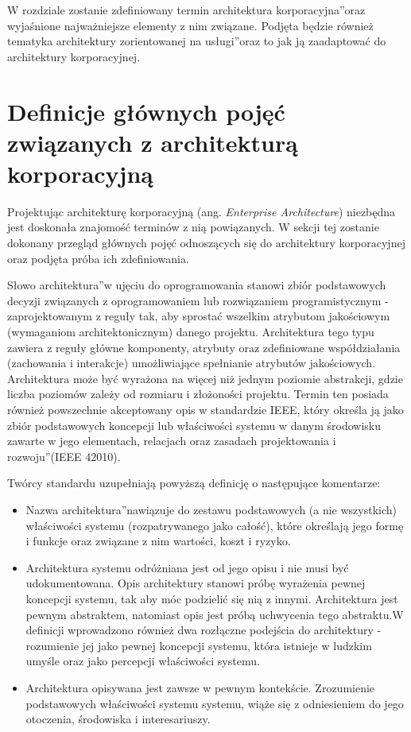 W rozdziale zostanie zdefiniowany termin \quotedblbase architektura korporacyjna\textquotedblright oraz wyjaśnione najważniejsze elementy z nim związane. Podjęta będzie również tematyka \quotedblbase architektury zorientowanej na usługi\textquotedblright oraz to jak ją zaadaptować do architektury korporacyjnej. 

\section{Definicje głównych pojęć związanych z architekturą korporacyjną}
Projektując architekturę korporacyjną (ang. \textit{Enterprise Architecture}) niezbędna jest doskonała znajomość terminów z nią powiązanych. W sekcji tej zostanie dokonany przegląd głównych pojęć odnoszących się do architektury korporacyjnej oraz podjęta próba ich zdefiniowania.

Słowo \quotedblbase architektura\textquotedblright w ujęciu do oprogramowania stanowi zbiór podstawowych decyzji związanych z oprogramowaniem lub rozwiązaniem programistycznym - zaprojektowanym z reguły tak, aby sprostać wszelkim atrybutom jakościowym (wymaganiom architektonicznym) danego projektu. Architektura tego typu zawiera z reguły główne komponenty, atrybuty oraz zdefiniowane współdziałania (zachowania i interakcje) umożliwiające spełnianie atrybutów jakościowych. Architektura może być wyrażona na więcej niż jednym poziomie abstrakcji, gdzie liczba poziomów zależy od rozmiaru i złożoności projektu. Termin ten posiada również powszechnie akceptowany opis w standardzie IEEE, który określa ją jako \quotedblbase zbiór podstawowych koncepcji lub właściwości systemu w danym środowisku zawarte w jego elementach, relacjach oraz zasadach projektowania i rozwoju\textquotedblright (IEEE 42010). \cite{SOAWzorceArch}

Twórcy standardu uzupełniają powyższą definicję o następujące komentarze: 
\begin{itemize}
\item{Nazwa \quotedblbase architektura\textquotedblright nawiązuje do zestawu podstawowych (a nie wszystkich) właściwości systemu (rozpatrywanego jako całość), które określają jego formę i funkcje oraz związane z nim wartości, koszt i ryzyko.}
\item{Architektura systemu odróżniana jest od jego opisu i nie musi być udokumentowana. Opis architektury stanowi próbę wyrażenia pewnej koncepcji systemu, tak aby móc podzielić się nią z innymi. Architektura jest pewnym abstraktem, natomiast opis jest próbą uchwycenia tego abstraktu.W definicji wprowadzono również dwa rozłączne podejścia do architektury - rozumienie jej jako pewnej koncepcji systemu, która istnieje w ludzkim  umyśle oraz jako percepcji właściwości systemu.}
\item{Architektura opisywana jest zawsze w pewnym kontekście. Zrozumienie podstawowych właściwości systemu systemu, wiąże się z odniesieniem do jego otoczenia, środowiska i interesariuszy.}
\end{itemize}

